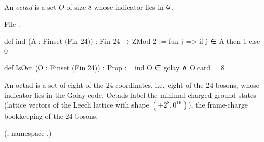 \begin{definition}\label{ch12:def:octad}
An \emph{octad} is a set $O$ of size $8$ whose indicator lies in $\mathcal{G}$.
\end{definition}
File .
\begin{leancode}
def ind (A : Finset (Fin 24)) : Fin 24 → ZMod 2 := fun j => if j ∈ A then 1 else 0

def IsOct (O : Finset (Fin 24)) : Prop := ind O ∈ golay ∧ O.card = 8
\end{leancode}

\begin{physics}
An octad is a set of eight of the $24$ coordinates, i.e.\ eight of the 24 bosons, whose indicator lies in the Golay code. Octads label the minimal charged ground states (lattice vectors of the Leech lattice with shape $(\pm 2^8,0^{16})$), the frame-charge bookkeeping of the $24$ bosons.
\end{physics}
(, namespace .)

